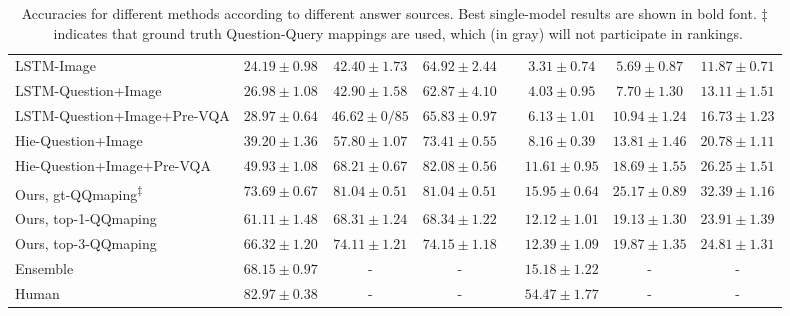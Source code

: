 \documentclass[10pt,journal]{IEEEtran}
\begin{document}
\begin{table*}[t!]
{\begin{tabular}{lccclccc}
		LSTM-Image                                           & $24.19\pm0.98$          & $42.40\pm1.73$          & $64.92\pm2.44$           &                      & $3.31\pm0.74$           & $5.69\pm0.87$           & $11.87\pm0.71$           \\
		{LSTM-Question+Image}                                  & {$26.98\pm1.08$}          & {$42.90\pm1.58$}          & {$62.87\pm4.10$}           &                      & {$4.03\pm0.95$}           & {$7.70\pm1.30$}          & {$13.11\pm1.51$}           \\ 
		{LSTM-Question+Image+Pre-VQA}                          & {$28.97\pm0.64$}          & {$46.62\pm0/85$}          & {$65.83\pm0.97$}           &                      & {$6.13\pm1.01$}           & {$10.94\pm1.24$}          & {$16.73\pm1.23$}           \\ 
		{Hie-Question+Image}              & {$39.20\pm1.36$}	& {$57.80\pm1.07$}	& {$73.41\pm0.55$} &      & {$8.16\pm0.39$}	& {$13.81\pm1.46$}	& {$20.78\pm1.11$} \\
		{Hie-Question+Image+Pre-VQA}		& {$49.93\pm1.08$}	& {$68.21\pm0.67$}	& {$\mathbf{82.08\pm0.56}$} &      & {$11.61\pm0.95$}	& {$18.69\pm1.55$}	& {$\mathbf{26.25\pm1.51}$} \\
		\hline \hline
		\cellcolor[rgb]{0.8,0.8,0.8}Ours, gt-QQmaping\textsuperscript{$\ddagger$}                                       & \cellcolor[rgb]{0.8,0.8,0.8}$73.69\pm0.67$          & \cellcolor[rgb]{0.8,0.8,0.8}$81.04\pm0.51$          & \cellcolor[rgb]{0.8,0.8,0.8}$81.04\pm0.51$           & \cellcolor[rgb]{0.8,0.8,0.8}                     & \cellcolor[rgb]{0.8,0.8,0.8}$15.95\pm0.64$           & \cellcolor[rgb]{0.8,0.8,0.8}$25.17\pm0.89$          & \cellcolor[rgb]{0.8,0.8,0.8}$32.39\pm1.16$           \\
		Ours, top-1-QQmaping                                    & $61.11\pm1.48$          & $68.31\pm1.24$          & $68.34\pm1.22$           &                      & $12.12\pm1.01$           & $19.13\pm1.30$          & $23.91\pm1.39$           \\
		Ours, top-3-QQmaping                                    & $\mathbf{66.32\pm1.20}$ & $\mathbf{74.11\pm1.21}$ & ${74.15\pm1.18}$  &                      & $\mathbf{12.39\pm1.09}$  & $\mathbf{19.87\pm1.35}$ & ${24.81\pm1.31}$  \\ 
				\hline\hline
		{Ensemble} & {$68.15\pm0.97$} &{-} &{-} & &{$15.18\pm1.22$} &{-} &{-}	\\
		\hline\hline
Human & $82.97\pm0.38$ &- &- & & $54.47\pm1.77$
      &-&- \\ \hline
	\end{tabular}}
	\caption{Accuracies for different methods according to different answer sources. Best single-model results are shown in bold font. $\ddagger$~indicates that ground truth Question-Query mappings are used, which (in \colorbox[rgb]{0.8,0.8,0.8}{gray}) will not participate in rankings.}
	\label{ans_cource}
\end{table*}
\end{document}
